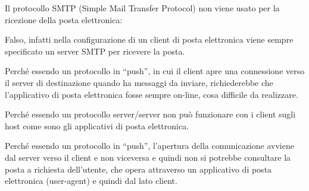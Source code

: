 \question[1]
Il protocollo SMTP (Simple Mail Transfer Protocol) non viene usato per la ricezione della posta elettronica:

\begin{checkboxes}
	\choice Falso, infatti nella configurazione di un client di posta elettronica viene sempre specificato un server SMTP per ricevere la posta.

	\CorrectChoice Perché essendo un protocollo in \enquote{push}, in cui il client apre una connessione verso il server di destinazione quando ha messaggi da inviare, richiederebbe che l'applicativo di posta elettronica fosse sempre on-line, cosa difficile da realizzare.

	\choice Perché essendo un protocollo server/server non può funzionare con i client sugli host come sono gli applicativi di posta elettronica.

	\choice Perché essendo un protocollo in \enquote{push}, l'apertura della comunicazione avviene dal server verso il client e non viceversa e quindi non si potrebbe consultare la posta a richiesta dell'utente, che opera attraverso un applicativo di posta elettronica (user-agent) e quindi dal lato client.
\end{checkboxes}
